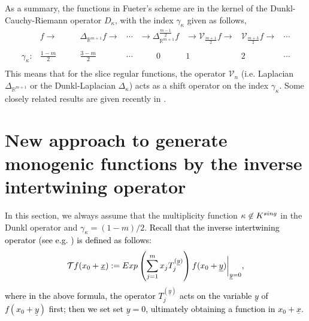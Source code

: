 \documentclass{amsart}
\newtheorem{theorem}{Theorem}[section]
\theoremstyle{definition}
\theoremstyle{remark}
\numberwithin{equation}{section}
\begin{document}
As a summary,  the functions in  Fueter's scheme are in the kernel of the Dunkl-Cauchy-Riemann operator $D_{\kappa}$,  with the index $\gamma_{\kappa}$ given as follows,
\begin{equation*}
\begin{matrix} &f\longrightarrow & \Delta_{\mathbb{R}^{m+1}} f\longrightarrow & \cdots &\longrightarrow \Delta_{\mathbb{R}^{m+1}}^{\frac{m-1}{2}}f & \longrightarrow \mathcal{V}_{\frac{m+1}{2}}f \longrightarrow   & \mathcal{V}_{\frac{m+3}{2}}f \longrightarrow & \cdots\\
\\   \gamma_{\kappa}: &\frac{1-m}{2}\quad\quad & \frac{3-m}{2}\qquad  & \cdots & \qquad 0 & 1 &2& \cdots\\
\end{matrix}
\end{equation*}
This means that for the slice regular functions, the operator $\mathcal{V}_{n}$ (i.e. Laplacian $\Delta_{\mathbb{R}^{m+1}}$ or the Dunkl-Laplacian $\Delta_{\kappa}$) acts as a shift operator on the index $\gamma_\kappa$. Some closely related results are given recently in \cite{giulio}.

\section{New approach to generate monogenic functions by the inverse intertwining operator} \label{fna}

In this section, we always assume that the multiplicity function  $\kappa \not\in K^{{\rm sing}}$ in the Dunkl operator and $\gamma_{\kappa}=(1-m)/2$.
\textcolor{black}{Recall that the inverse intertwining operator (see e.g. \cite[Definition  6.5.1]{dx1}) is defined as follows:
\begin{equation*}
   \mathcal{T}f(x_{0}+\underline{x}):={\rm Exp} \left(\sum_{j=1}^{m} x_{j}T_{j}^{(\underline{y})}\right)f(x_{0}+\underline{y})\bigg|_{\underline{y}=0},
\end{equation*}
 where in the above formula, the operator $T_{j}^{(\underline{y})}$ acts  on the variable $\underline{y}$ of $f(x_{0}+\underline{y})$ first;  then we set set $\underline{y}=0$,   ultimately obtaining a function in $x_{0}+\underline{x}$.}
\end{document}
